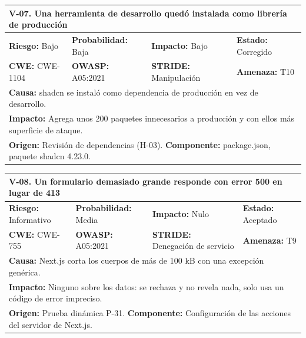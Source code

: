 \documentclass[12pt, letterpaper]{article}
\begin{document}
\vspace{8pt}

\noindent\begin{tabular}{|p{\celda}|p{\celda}|p{\celda}|p{\celda}|}
\hline
\multicolumn{4}{|p{\fila}|}{\cellcolor{gray!12}\textbf{V-07. Una herramienta de desarrollo quedó instalada como librería de producción}} \\
\hline
\cellcolor{yellow!25}\textbf{Riesgo:} Bajo & \textbf{Probabilidad:} Baja & \textbf{Impacto:} Bajo & \textbf{Estado:} Corregido \\
\hline
\textbf{CWE:} CWE-1104 & \textbf{OWASP:} A05:2021 & \textbf{STRIDE:} Manipulación & \textbf{Amenaza:} T10 \\
\hline
\multicolumn{4}{|p{\fila}|}{\textbf{Causa:} shadcn se instaló como dependencia de producción en vez de desarrollo.} \\
\hline
\multicolumn{4}{|p{\fila}|}{\textbf{Impacto:} Agrega unos 200 paquetes innecesarios a producción y con ellos más superficie de ataque.} \\
\hline
\multicolumn{4}{|p{\fila}|}{\textbf{Origen:} Revisión de dependencias (H-03). \textbf{Componente:} package.json, paquete shadcn 4.23.0.} \\
\hline
\end{tabular}

\vspace{8pt}

\noindent\begin{tabular}{|p{\celda}|p{\celda}|p{\celda}|p{\celda}|}
\hline
\multicolumn{4}{|p{\fila}|}{\cellcolor{gray!12}\textbf{V-08. Un formulario demasiado grande responde con error 500 en lugar de 413}} \\
\hline
\cellcolor{gray!15}\textbf{Riesgo:} Informativo & \textbf{Probabilidad:} Media & \textbf{Impacto:} Nulo & \textbf{Estado:} Aceptado \\
\hline
\textbf{CWE:} CWE-755 & \textbf{OWASP:} A05:2021 & \textbf{STRIDE:} Denegación de servicio & \textbf{Amenaza:} T9 \\
\hline
\multicolumn{4}{|p{\fila}|}{\textbf{Causa:} Next.js corta los cuerpos de más de 100 kB con una excepción genérica.} \\
\hline
\multicolumn{4}{|p{\fila}|}{\textbf{Impacto:} Ninguno sobre los datos: se rechaza y no revela nada, solo usa un código de error impreciso.} \\
\hline
\multicolumn{4}{|p{\fila}|}{\textbf{Origen:} Prueba dinámica P-31. \textbf{Componente:} Configuración de las acciones del servidor de Next.js.} \\
\hline
\end{tabular}
\end{document}
